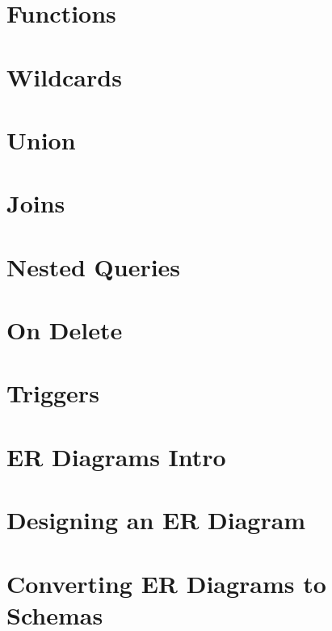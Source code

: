 \documentclass[openany]{book}
\begin{document}
\chapter{Functions}


\chapter{Wildcards}


\chapter{Union}


\chapter{Joins}


\chapter{Nested Queries}


\chapter{On Delete}


\chapter{Triggers}


\chapter{ER Diagrams Intro}


\chapter{Designing an ER Diagram}


\chapter{Converting ER Diagrams to Schemas}





\end{document}

